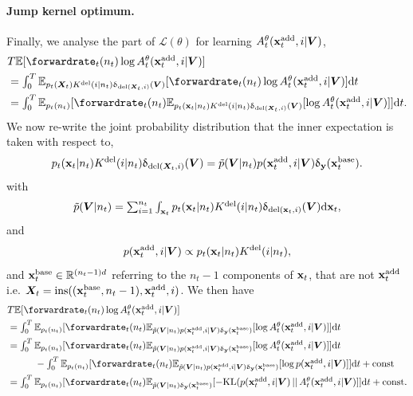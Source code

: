 \paragraph{Jump kernel optimum.} Finally, we analyse the part of
$\mathcal{L}(\theta)$ for learning $A_t^\theta({\mathbf{x}}^{\textup{add}}_t, i | {\bm{V}})$,
\begin{align}
    &\textstyle T \mathbb{E} [ \forwardrate_t(n_t) \log \autonet_t^\theta(\xadd_t, i | \mV) ]\\
    &\textstyle = \int_{0}^T \mathbb{E}_{p_t(\mX_t) \delidxdist(i | n_t) \updelta_{\text{del}(\mX_t, i)}(\mV)} [ \forwardrate_t(n_t) \log \autonet_t^\theta(\xadd_t, i | \mV) ] \rmd t\\
    &\textstyle = \int_{0}^T \mathbb{E}_{p_t(n_t)} [ \forwardrate_t(n_t) \mathbb{E}_{p_t(\rvx_t | n_t) \delidxdist(i | n_t) \updelta_{\text{del}(\mX_t, i)}(\mV)} [ \log \autonet_t^\theta(\xadd_t, i | \mV) ] ] \rmd t.
\end{align}
We now re-write the joint probability distribution that the inner expectation is taken with respect to,
\begin{equation}
    p_t({\mathbf{x}}_t | n_t) K^{\textup{del}}(i | n_t) \updelta_{\text{del}({\bm{X}}_t, i)}({\bm{V}}) = \tilde{p}({\bm{V}} | n_t) p({\mathbf{x}}^{\textup{add}}_t, i | {\bm{V}}) \updelta_{\mathbf{y}}({\mathbf{x}}_t^{\text{base}}) . 
\end{equation}
with 
\begin{equation}
  \textstyle 
    \tilde{p}({\bm{V}} | n_t) = \sum_{i=1}^{n_t} \int_{{\mathbf{x}}_t} p_t({\mathbf{x}}_t | n_t) K^{\textup{del}}(i | n_t) \updelta_{\text{del}({\mathbf{x}}_t, i)}({\bm{V}}) \mathrm{d} {\mathbf{x}}_t,
  \end{equation}
  and
\begin{equation}
    p({\mathbf{x}}^{\textup{add}}_t, i | {\bm{V}}) \propto p_t({\mathbf{x}}_t | n_t) K^{\textup{del}}(i | n_t) , 
\end{equation}
and ${\mathbf{x}}_t^{\text{base}} \in \mathbb{R}^{(n_t-1)d}$ referring to the $n_t - 1$ components of ${\mathbf{x}}_t$, that are not ${\mathbf{x}}_t^{\text{add}}$ i.e. ${\bm{X}}_t = \text{ins}(({\mathbf{x}}_t^{\text{base}}, n_t - 1), {\mathbf{x}}^{\textup{add}}_t, i)$.
We then have
\begin{align}
    &\textstyle T \mathbb{E} [ \forwardrate_t(n_t) \log \autonet_t^\theta(\xadd_t, i | \mV) ]\\
    &\textstyle = \int_{0}^T \mathbb{E}_{p_t(n_t)} [ \forwardrate_t(n_t) \mathbb{E}_{\tilde{p}(\mV | n_t) p(\xadd_t, i | \mV) \updelta_{\y}(\rvx_t^{\text{base}})} [ \log \autonet_t^\theta(\xadd_t, i | \mV) ] ] \rmd t\\
    &\textstyle = \int_{0}^T \mathbb{E}_{p_t(n_t)} [ \forwardrate_t(n_t) \mathbb{E}_{\tilde{p}(\mV | n_t) p(\xadd_t, i | \mV) \updelta_{\y}(\rvx_t^{\text{base}})} [ \log \autonet_t^\theta(\xadd_t, i | \mV) ] ] \rmd t \\
    &\textstyle  \hspace{1cm} - \int_{0}^T \mathbb{E}_{p_t(n_t)} [ \forwardrate_t(n_t) \mathbb{E}_{\tilde{p}(\mV | n_t) p(\xadd_t, i | \mV) \updelta_{\y}(\rvx_t^{\text{base}})} [ \log p(\xadd_t, i | \mV) ] ] \rmd t + \text{const}\\
    &\textstyle = \int_{0}^T \mathbb{E}_{p_t(n_t)} [ \forwardrate_t(n_t) \mathbb{E}_{\tilde{p}(\mV | n_t) \updelta_{\y}(\rvx_t^{\text{base}}) } [ - \text{KL}(p(\xadd_t, i | \mV) \, || \, A_t^\theta(\xadd_t, i | \mV) ] ] \rmd t + \text{const} .
\end{align}
